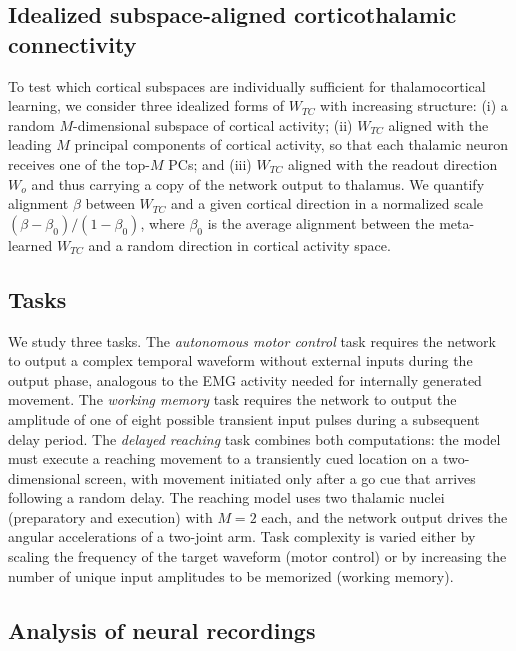 \documentclass[11pt]{article}
\begin{document}
\subsection{Idealized subspace-aligned corticothalamic connectivity}

To test which cortical subspaces are individually sufficient for
thalamocortical learning, we consider three idealized forms of
$W_{TC}$ with increasing structure: (i) a random $M$-dimensional
subspace of cortical activity; (ii) $W_{TC}$ aligned with the leading
$M$ principal components of cortical activity, so that each thalamic
neuron receives one of the top-$M$ PCs; and (iii) $W_{TC}$ aligned with
the readout direction $W_o$ and thus carrying a copy of the network
output to thalamus. We quantify alignment $\beta$ between $W_{TC}$ and
a given cortical direction in a normalized scale
$(\beta - \beta_0)/(1 - \beta_0)$, where $\beta_0$ is the average
alignment between the meta-learned $W_{TC}$ and a random direction in
cortical activity space.

\subsection{Tasks}

We study three tasks. The \emph{autonomous motor control} task requires
the network to output a complex temporal waveform without external
inputs during the output phase, analogous to the EMG activity needed
for internally generated movement. The \emph{working memory} task
requires the network to output the amplitude of one of eight possible
transient input pulses during a subsequent delay period. The
\emph{delayed reaching} task combines both computations: the model
must execute a reaching movement to a transiently cued location on a
two-dimensional screen, with movement initiated only after a go cue
that arrives following a random delay. The reaching model uses two
thalamic nuclei (preparatory and execution) with $M = 2$ each, and the
network output drives the angular accelerations of a two-joint arm.
Task complexity is varied either by scaling the frequency of the
target waveform (motor control) or by increasing the number of unique
input amplitudes to be memorized (working memory).

\subsection{Analysis of neural recordings}
\end{document}
